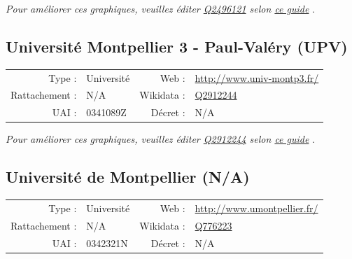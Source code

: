 \documentclass[12pt,french,landscape]{article}
\begin{document}
\textit{\scriptsize Pour améliorer ces graphiques, veuillez éditer \href{https://www.wikidata.org/entity/Q2496121}{Q2496121}  selon \href{https://github.com/cpesr/wikidataESR/blob/master/Rmd/wikidataESR.md}{ce guide}}
.


\newpage

\hypertarget{universituxe9-montpellier-3---paul-valuxe9ry-upv}{%
\subsection{Université Montpellier 3 - Paul-Valéry
(UPV)}\label{universituxe9-montpellier-3---paul-valuxe9ry-upv}}

\begin{tabular*}{0.45\textwidth}{rp{2cm}rl}  
\hline  
Type : & Université & Web : &\href{http://www.univ-montp3.fr/}{http://www.univ-montp3.fr/} \\  
Rattachement : & N/A & Wikidata : & \href{https://www.wikidata.org/entity/Q2912244}{Q2912244} \\  
UAI : & 0341089Z & Décret : & N/A \\  
\hline  
\end{tabular*}

\textit{\scriptsize Pour améliorer ces graphiques, veuillez éditer \href{https://www.wikidata.org/entity/Q2912244}{Q2912244}  selon \href{https://github.com/cpesr/wikidataESR/blob/master/Rmd/wikidataESR.md}{ce guide}}
.


\newpage

\hypertarget{universituxe9-de-montpellier-na}{%
\subsection{Université de Montpellier
(N/A)}\label{universituxe9-de-montpellier-na}}

\begin{tabular*}{0.45\textwidth}{rp{2cm}rl}  
\hline  
Type : & Université & Web : &\href{http://www.umontpellier.fr/}{http://www.umontpellier.fr/} \\  
Rattachement : & N/A & Wikidata : & \href{https://www.wikidata.org/entity/Q776223}{Q776223} \\  
UAI : & 0342321N & Décret : & N/A \\  
\hline  
\end{tabular*}
\end{document}
